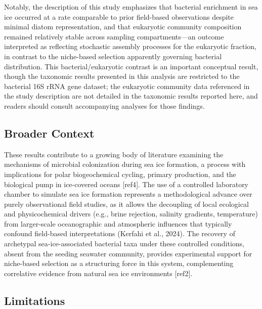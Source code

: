 \documentclass[
  11pt,
]{article}
\begin{document}
Notably, the description of this study emphasizes that bacterial
enrichment in sea ice occurred at a rate comparable to prior field-based
observations despite minimal diatom representation, and that eukaryotic
community composition remained relatively stable across sampling
compartments---an outcome interpreted as reflecting stochastic assembly
processes for the eukaryotic fraction, in contrast to the niche-based
selection apparently governing bacterial distribution. This
bacterial/eukaryotic contrast is an important conceptual result, though
the taxonomic results presented in this analysis are restricted to the
bacterial 16S rRNA gene dataset; the eukaryotic community data
referenced in the study description are not detailed in the taxonomic
results reported here, and readers should consult accompanying analyses
for those findings.

\subsection{Broader Context}\label{broader-context}

These results contribute to a growing body of literature examining the
mechanisms of microbial colonization during sea ice formation, a process
with implications for polar biogeochemical cycling, primary production,
and the biological pump in ice-covered oceans {[}ref4{]}. The use of a
controlled laboratory chamber to simulate sea ice formation represents a
methodological advance over purely observational field studies, as it
allows the decoupling of local ecological and physicochemical drivers
(e.g., brine rejection, salinity gradients, temperature) from
larger-scale oceanographic and atmospheric influences that typically
confound field-based interpretations (Kerfahi et al., 2024). The
recovery of archetypal sea-ice-associated bacterial taxa under these
controlled conditions, absent from the seeding seawater community,
provides experimental support for niche-based selection as a structuring
force in this system, complementing correlative evidence from natural
sea ice environments {[}ref2{]}.

\subsection{Limitations}\label{limitations}
\end{document}
